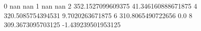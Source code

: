 0 nan nan
1 nan nan
2 352.1527099609375 41.346160888671875
4 320.5085754394531 9.7020263671875
6 310.8065490722656 0.0
8 309.3673095703125 -1.439239501953125
